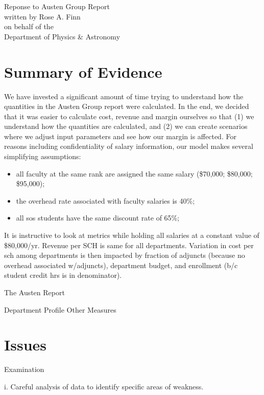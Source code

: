 \documentclass[12pt]{article}
\begin{document}
\begin{center}
{\Large
Reponse to Austen Group Report \\ 

\medskip
written by Rose A. Finn \\ \medskip  on behalf of the\\
\medskip
Department of Physics \& Astronomy \\ }
\end{center}


\section{Summary of Evidence}

We have invested a significant amount of time trying to understand how the quantities  in the Austen Group report were 
calculated.  In the end, we decided that it was easier to calculate cost, revenue and margin ourselves so that (1) we understand
how the quantities are calculated, and (2) we can create scenarios where we adjust input parameters and see how 
our margin is affected.   For reasons including confidentiality of salary information, our model makes several simplifying 
assumptions:
\begin{itemize}
\item all faculty at the same rank are assigned the same salary (\$70,000; \$80,000; \$95,000);
\item the overhead rate associated with faculty salaries is 40\%;
\item all sos students have the same discount rate of 65\%;
\end{itemize}


It is instructive to look at metrics while holding all salaries at a constant value of \$80,000/yr.  Revenue per SCH is same for all 
departments.  Variation in cost per sch among departments is then impacted by fraction of adjuncts (because no overhead associated w/adjuncts), department budget, and enrollment (b/c student credit hrs is in denominator).



The Austen Report

Department Profile
Other Measures

\section{Issues}
Examination

i. Careful analysis of data to identify specific areas of weakness.
\end{document}
